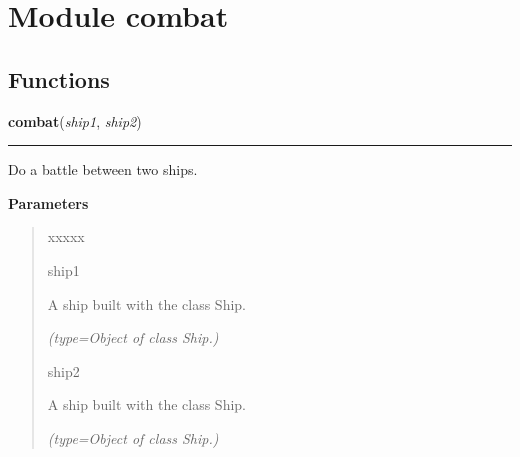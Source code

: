 %
%
%


\section{Module combat}

    \label{combat}


  \subsection{Functions}

    \label{combat:combat}

    \vspace{0.5ex}

\hspace{.8\funcindent}\begin{boxedminipage}{\funcwidth}

    \raggedright \textbf{combat}(\textit{ship1}, \textit{ship2})

    \vspace{-1.5ex}

    \rule{\textwidth}{0.5\fboxrule}
\setlength{\parskip}{2ex}
    Do a battle between two ships.

\setlength{\parskip}{1ex}
      \textbf{Parameters}
      \vspace{-1ex}

      \begin{quote}
        \begin{Ventry}{xxxxx}

          \item[ship1]

          A ship built with the class Ship.

            {\it (type=Object of class Ship.)}

          \item[ship2]

          A ship built with the class Ship.

            {\it (type=Object of class Ship.)}

        \end{Ventry}

      \end{quote}

    \end{boxedminipage}


